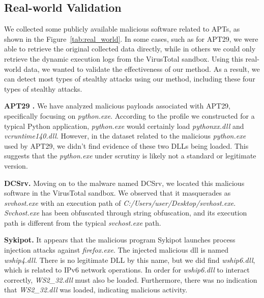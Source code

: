 

\subsection{Real-world Validation}
\label{sec-real-world}

We collected some publicly available malicious software related to APTs, as shown in the Figure~\ref{tab:real_world}.
In some cases, such as for APT29, we were able to retrieve the original collected data directly, while in others we could only retrieve the dynamic execution logs from the VirusTotal sandbox. Using this real-world data, we wanted to validate the effectiveness of our method. As a result, we can detect most types of stealthy attacks using our method, including these four types of stealthy attacks.


\noindent
{\bf APT29 \cite{mitre_g0016}.}
We have analyzed malicious payloads associated with APT29, specifically focusing on \textit{python.exe}. According to the profile we constructed for a typical Python application, \textit{python.exe} would certainly load \textit{pythonxx.dll} and \textit{vcruntime140.dll}. However, in the dataset related to the malicious \textit{python.exe} used by APT29, we didn't find evidence of these two DLLs being loaded. This suggests that the \textit{python.exe} under scrutiny is likely not a standard or legitimate version.

\noindent
{\bf DCSrv\cite{checkpoint2021}.}
Moving on to the malware named DCSrv, we located this malicious software in the VirusTotal sandbox. We observed that it masquerades as \textit{svvhost.exe} with an execution path of \textit{C:/Users/user/Desktop/svvhost.exe}. \textit{Svchost.exe} has been obfuscated through string obfuscation, and its execution path is different from the typical \textit{svchost.exe} path.

\noindent
{\bf Sykipot\cite{att2023}.}
It appears that the malicious program Sykipot launches process injection attacks against \textit{firefox.exe}. The injected malicious dll is named \textit{wship4.dll}. There is no legitimate DLL by this name, but we did find \textit{wship6.dll}, which is related to IPv6 network operations. In order for \textit{wship6.dll} to interact correctly, \textit{WS2\_32.dll} must also be loaded. Furthermore, there was no indication that \textit{WS2\_32.dll} was loaded, indicating malicious activity.








